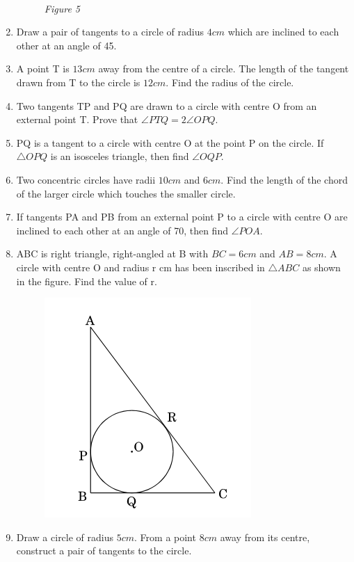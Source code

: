 \documentclass{article}
\begin{document}
\begin{enumerate}
\begin{figure}[!htb]
		\\
		\emph{Figure 5}
		\label{fig:my_label}
	\end{figure}
	\item Draw a pair of tangents to a circle of radius $4 cm$ which are inclined to each other at an angle of 45\textdegree.	
	\item A point T is $13 cm$ away from the centre of a circle. The length of the tangent drawn from T to the circle is $12 cm$. Find the radius of the circle.
	\item Two tangents TP and PQ are drawn to a circle with centre O from an external point T. Prove that $\angle PTQ = 2 \angle OPQ$.
	\item PQ is a tangent to a circle with centre O at the point P on the circle. If $\triangle OPQ$ is an isosceles triangle, then find $\angle OQP$.
	\item Two concentric circles have radii $10 cm$ and $6 cm$. Find the length of the chord of the larger circle which touches the smaller circle.
	\item If tangents PA and PB from an external point P to a circle with centre O are inclined to each other at an angle of 70\textdegree, then find $\angle POA$.
	\item ABC is right triangle, right-angled at B with $BC = 6 cm$ and $AB = 8 cm$. A circle with centre O and radius r cm has been inscribed in $\triangle ABC$ as shown in the figure. Find the value of r.
		\begin{figure}[H]
			\centering
			\includegraphics[scale=0.8]{fig2.png}
			\label{fig:my_label}
		\end{figure}
	\item Draw a circle of radius $5 cm$. From a point $8 cm$ away from its centre, construct a pair of tangents to the circle.

\end{enumerate}
\end{document}
